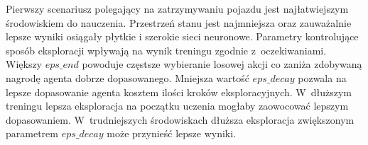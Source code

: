 \documentclass[12pt, oneside]{article}
\begin{document}
Pierwszy scenariusz polegający na zatrzymywaniu pojazdu jest najłatwiejszym środowiskiem do nauczenia. Przestrzeń stanu jest najmniejsza oraz zauważalnie lepsze wyniki osiągały płytkie i szerokie sieci neuronowe.
Parametry kontrolujące sposób eksploracji wpływają na wynik treningu zgodnie z~oczekiwaniami. Większy $eps\_end$ powoduje częstsze wybieranie losowej akcji co zaniża zdobywaną nagrodę agenta dobrze dopasowanego. Mniejsza wartość $eps\_decay$ pozwala na lepsze dopasowanie agenta kosztem ilości kroków eksploracyjnych. W~dłuższym treningu lepsza eksploracja na początku uczenia mogłaby zaowocować lepszym dopasowaniem. W~trudniejszych środowiskach dłuższa eksploracja zwiększonym parametrem $eps\_decay$ może przynieść lepsze wyniki. 
\newpage
\end{document}
